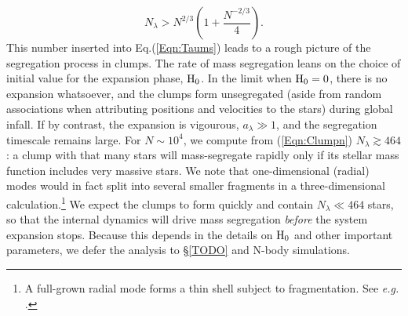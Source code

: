 \begin{equation} \label{Eqn:Clumpn} 
   N_\lambda > N^{2/3}\left( 1 + \frac{N^{-2/3}}{4} \right) .
\end{equation}
This number inserted into Eq.(\ref{Eqn:Taums}) leads to a rough picture of the segregation process in clumps. The rate of mass segregation leans  on the choice of initial value for the expansion phase, ${\textrm{H}}_0$. In the limit when ${\textrm{H}}_0 = 0$, there is no expansion whatsoever, and the clumps form unsegregated (aside from random associations when attributing positions and velocities to the stars) during global infall. If by contrast, the expansion is vigourous, $a_\lambda \gg 1$, and the segregation timescale remains large. For $N \sim 10^4$, we compute from (\ref{Eqn:Clumpn}) $N_\lambda \gtrsim 464$: a clump with that many stars will mass-segregate rapidly only if its stellar mass function includes very massive stars. We note that one-dimensional (radial) modes would in fact split into several smaller fragments in a three-dimensional calculation.\footnote{ A full-grown radial mode forms a thin shell subject to fragmentation. See \textit{e.g.}  \cite{Ehlerova1997,Wunsch2010}.} We expect  the clumps to form quickly  and contain $N_\lambda \ll 464$ stars, so  that the internal dynamics 
will drive mass segregation {\it before} the system expansion stops. Because this depends in the details on ${\textrm{H}}_0$ and other important parameters, 
we defer the analysis to \S \ref{TODO} and N-body simulations. 



